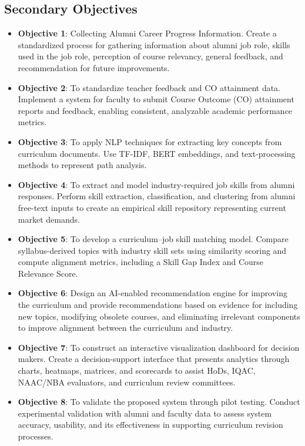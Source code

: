 \subsection{Secondary Objectives}
\begin{itemize}
    \item \textbf{Objective 1}: Collecting Alumni Career Progress Information. Create a standardized process for gathering information about alumni job role, skills used in the job role, perception of course relevancy, general feedback, and recommendation for future improvements.
    \item \textbf{Objective 2}: To standardize teacher feedback and CO attainment data. Implement a system for faculty to submit Course Outcome (CO) attainment reports and feedback, enabling consistent, analyzable academic performance metrics.
    \item \textbf{Objective 3}: To apply NLP techniques for extracting key concepts from curriculum documents. Use TF-IDF, BERT embeddings, and text-processing methods to represent path analysis.
    \item \textbf{Objective 4}: To extract and model industry-required job skills from alumni responses. Perform skill extraction, classification, and clustering from alumni free-text inputs to create an empirical skill repository representing current market demands.
    \item \textbf{Objective 5}: To develop a curriculum--job skill matching model. Compare syllabus-derived topics with industry skill sets using similarity scoring and compute alignment metrics, including a Skill Gap Index and Course Relevance Score.
    \item \textbf{Objective 6}: Design an AI-enabled recommendation engine for improving the curriculum and provide recommendations based on evidence for including new topics, modifying obsolete courses, and eliminating irrelevant components to improve alignment between the curriculum and industry.
    \item \textbf{Objective 7}: To construct an interactive visualization dashboard for decision makers. Create a decision-support interface that presents analytics through charts, heatmaps, matrices, and scorecards to assist HoDs, IQAC, NAAC/NBA evaluators, and curriculum review committees.
    \item \textbf{Objective 8}: To validate the proposed system through pilot testing. Conduct experimental validation with alumni and faculty data to assess system accuracy, usability, and its effectiveness in supporting curriculum revision processes.
\end{itemize}

